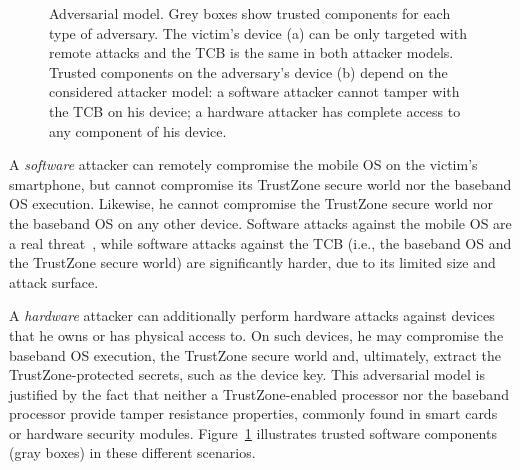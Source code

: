 \begin{figure}[!ht]
    \centering
    
    
    
    \caption[Adversarial models for a TrustZone-enabled smartphone]{Adversarial model. Grey boxes show trusted components for each type
      of adversary. The victim's device (a) can be only targeted with
      remote attacks and the TCB is the same in both attacker models. Trusted
      components on the adversary's device (b) depend on the
      considered attacker model: a software attacker cannot tamper with the TCB
      on his device; a hardware attacker has complete access to any component
      of his device.}
    \label{fig:ps_tee_adversary-model}
\end{figure}

A \emph{software} attacker can remotely compromise the mobile OS on the victim's
smartphone, but cannot compromise its TrustZone secure world nor the baseband OS
execution.  Likewise, he cannot compromise the TrustZone secure world nor the
baseband OS on any other device.  Software attacks against the mobile OS are a
real threat~\cite{Felt11,zhou2012sp}, while software attacks against the TCB
(i.e., the baseband OS and the TrustZone secure world) are significantly harder,
due to its limited size and attack surface.

A \emph{hardware} attacker can additionally perform hardware attacks against
devices that he owns or has physical access to.  On such devices, he may
compromise the baseband OS execution, the TrustZone secure world and,
ultimately, extract the TrustZone-protected secrets, such as the device key.
This adversarial model is justified by the fact that neither a TrustZone-enabled
processor nor the baseband processor provide tamper resistance properties,
commonly found in smart cards or hardware security
modules. Figure~\ref{fig:ps_tee_adversary-model} illustrates trusted software
components (gray boxes) in these different scenarios.

